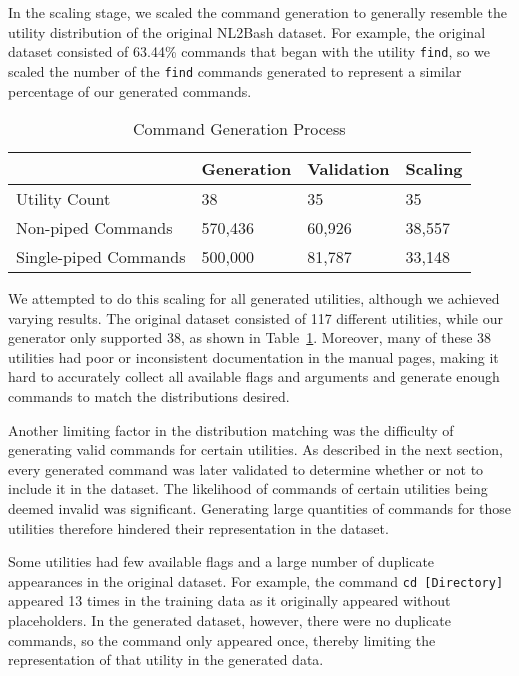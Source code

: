 \documentclass{river-journal}
\begin{document}
In the scaling stage, we scaled the command generation to generally resemble the utility distribution of the original NL2Bash dataset. For example, the original dataset consisted of 63.44\% commands that began with the utility \texttt{find}, so we scaled the number of the \texttt{find} commands generated to represent a similar percentage of our generated commands. 

\begin{table}[bhtp]
\caption{\label{table:stats} Command Generation Process}
\centering
\begin{tabular}{llll}
\hline 
& \textbf {Generation}  & \textbf{Validation} & \textbf{Scaling}\\
\hline
Utility Count & 38 & 35 & 35 \\
\hline
Non-piped Commands & 570,436 & 60,926 & 38,557 \\
\hline
Single-piped Commands & 500,000 & 81,787 & 33,148 \\
\hline
\end{tabular}
\end{table}

We attempted to do this scaling for all generated utilities, although we achieved varying results. The original dataset consisted of 117 different utilities, while our generator only supported 38, as shown in Table~\ref{table:stats}. Moreover, many of these 38 utilities had poor or inconsistent documentation in the manual pages, making it hard to accurately collect all available flags and arguments and generate enough commands to match the distributions desired.

Another limiting factor in the distribution matching was the difficulty of generating valid commands for certain utilities. As described in the next section, every generated command was later validated to determine whether or not to include it in the dataset. The likelihood of commands of certain utilities being deemed invalid was significant. Generating large quantities of commands for those utilities therefore hindered their representation in the dataset.

Some utilities had few available flags and a large number of duplicate appearances in the original dataset. For example, the command \texttt{cd [Directory]} appeared 13 times in the training data as it originally appeared without placeholders. In the generated dataset, however, there were no duplicate commands, so the command only appeared once, thereby limiting the representation of that utility in the generated data.
\end{document}

